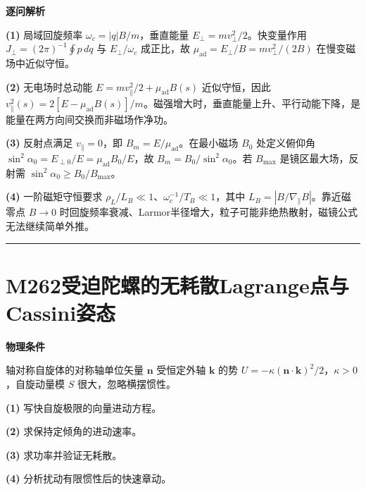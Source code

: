 \documentclass[UTF8,a4paper,11pt,oneside,openany]{ctexbook}
\begin{document}
\par\medskip\noindent\textbf{逐问解析}
\par\noindent\textbf{(1)} 局域回旋频率 \(\omega_c=|q|B/m\)，垂直能量 \(E_\perp=mv_\perp^2/2\)。快变量作用 \(J_\perp=(2\pi)^{-1}\oint p\,dq\) 与 \(E_\perp/\omega_c\) 成正比，故 \(\mu_{\mathrm{ad}}=E_\perp/B=mv_\perp^2/(2B)\) 在慢变磁场中近似守恒。
\par\noindent\textbf{(2)} 无电场时总动能 \(E=mv_\parallel^2/2+\mu_{\mathrm{ad}}B(s)\) 近似守恒，因此 \(v_\parallel^2(s)=2[E-\mu_{\mathrm{ad}}B(s)]/m\)。磁强增大时，垂直能量上升、平行动能下降，是能量在两方向间交换而非磁场作净功。
\par\noindent\textbf{(3)} 反射点满足 \(v_\parallel=0\)，即 \(B_m=E/\mu_{\mathrm{ad}}\)。在最小磁场 \(B_0\) 处定义俯仰角 \(\sin^2\alpha_0=E_{\perp0}/E=\mu_{\mathrm{ad}}B_0/E\)，故 \(B_m=B_0/\sin^2\alpha_0\)。若 \(B_{\max}\) 是镜区最大场，反射需 \(\sin^2\alpha_0\ge B_0/B_{\max}\)。
\par\noindent\textbf{(4)} 一阶磁矩守恒要求 \(\rho_L/L_B\ll1\)、\(\omega_c^{-1}/T_B\ll1\)，其中 \(L_B=|B/\nabla_\parallel B|\)。靠近磁零点 \(B\to0\) 时回旋频率衰减、Larmor半径增大，粒子可能非绝热散射，磁镜公式无法继续简单外推。

\par\bigskip\hrule\bigskip
\section*{M262\quad 受迫陀螺的无耗散Lagrange点与Cassini姿态}
\textbf{物理条件}\par 轴对称自旋体的对称轴单位矢量 \(\boldsymbol n\) 受恒定外轴 \(\boldsymbol k\) 的势 \(U=-\kappa(\boldsymbol n\cdot\boldsymbol k)^2/2\)，\(\kappa>0\)，自旋动量模 \(S\) 很大，忽略横摆惯性。
\par\noindent\textbf{(1)} 写快自旋极限的向量进动方程。
\par\noindent\textbf{(2)} 求保持定倾角的进动速率。
\par\noindent\textbf{(3)} 求功率并验证无耗散。
\par\noindent\textbf{(4)} 分析扰动有限惯性后的快速章动。
\end{document}
